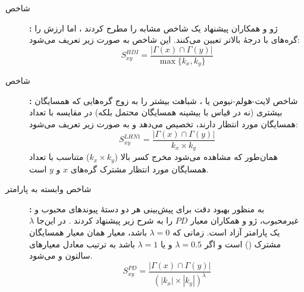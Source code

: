 \begin{description}
\item[شاخص ]\textbf{:}
ژو و همکاران پیشنهاد یک شاخص مشابه  را مطرح کردند \cite{zhou2009predicting}، اما ارزش را گره‌های با درجهٔ بالاتر تعیین می‌کنند. این شاخص به صورت زیر تعریف می‌شود:
\begin{equation}
S_{xy}^{HDI}=\frac{|\Gamma(x)\cap\Gamma(y)|}{\max\{ k_{x},k_{y} \}}
\end{equation}

\item[شاخص ]\textbf{:}
شاخص لایت-هولم-نیومن یا ، شباهت بیشتر را به زوج گره‌هایی که همسایگان بیشتری (نه در قیاس با بیشینه همسایگان محتمل بلکه) در مقایسه با تعداد همسایگان مورد انتظار دارند، تخصیص می‌دهد \cite{leicht2006vertex} و به صورت زیر تعریف می‌شود:
 \begin{equation}
S_{xy}^{LHN1}=\frac{|\Gamma(x)\cap\Gamma(y)|}{k_{x}\times k_{y}}
\end{equation}
همان‌طور که مشاهده می‌شود مخرج کسر بالا ($k_{x} \times k_{y}$) متناسب با تعداد همسایگان مورد انتظار مشترک گره‌های $x$ و $y$ است.

\item[شاخص وابسته به پارامتر ]\textbf{:}
به منظور بهبود دقت برای پیش‌بینی هر دو دستهٔ پیوندهای محبوب و غیرمحبوب، ژو و همکاران معیار $PD$ را به شرح زیر پیشنهاد کردند \cite{zhu2012uncovering}. در این‌جا $\lambda$ یک پارامتر آزاد است. زمانی که $\lambda=0$ باشد، معیار  همان معیار همسایگان مشترک () است و اگر $\lambda=0.5$ و یا $\lambda=1$ باشد به ترتیب معادل معیارهای سالتون و  می‌شود. 
\begin{equation}
S_{xy}^{PD}=\frac{|\Gamma(x)\cap\Gamma(y)|}{(|k_{x}|\times |k_{y}|)^\lambda}
\end{equation}


\end{description}
